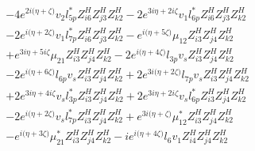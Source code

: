 \begin{align}
 &-4 e^{2 i \Big(\eta +\zeta \Big)} v_2 l_{5p}^* Z_{{i 6}}^{H} Z_{{j 3}}^{H} Z_{{k 2}}^{H} -2 e^{3 i \eta +2 i \zeta } v_1 l_{6p}^* Z_{{i 6}}^{H} Z_{{j 3}}^{H} Z_{{k 2}}^{H} \nonumber \\ 
 &-2 e^{i \Big(\eta +2 \zeta \Big)} v_1 l_{7p}^* Z_{{i 6}}^{H} Z_{{j 3}}^{H} Z_{{k 2}}^{H} - e^{i \Big(\eta +5 \zeta \Big)} \mu_{12} Z_{{i 3}}^{H} Z_{{j 4}}^{H} Z_{{k 2}}^{H} \nonumber \\ 
 &+e^{3 i \eta +5 i \zeta } \mu_{21} Z_{{i 3}}^{H} Z_{{j 4}}^{H} Z_{{k 2}}^{H} -2 e^{i \Big(\eta +4 \zeta \Big)} l_{3p} v_s Z_{{i 3}}^{H} Z_{{j 4}}^{H} Z_{{k 2}}^{H} \nonumber \\ 
 &-2 e^{i \Big(\eta +6 \zeta \Big)} l_{6p} v_s Z_{{i 3}}^{H} Z_{{j 4}}^{H} Z_{{k 2}}^{H} +2 e^{3 i \Big(\eta +2 \zeta \Big)} l_{7p} v_s Z_{{i 3}}^{H} Z_{{j 4}}^{H} Z_{{k 2}}^{H} \nonumber \\ 
 &+2 e^{3 i \eta +4 i \zeta } v_s l_{3p}^* Z_{{i 3}}^{H} Z_{{j 4}}^{H} Z_{{k 2}}^{H} +2 e^{3 i \eta +2 i \zeta } v_s l_{6p}^* Z_{{i 3}}^{H} Z_{{j 4}}^{H} Z_{{k 2}}^{H} \nonumber \\ 
 &-2 e^{i \Big(\eta +2 \zeta \Big)} v_s l_{7p}^* Z_{{i 3}}^{H} Z_{{j 4}}^{H} Z_{{k 2}}^{H} +e^{3 i \Big(\eta +\zeta \Big)} \mu_{12}^* Z_{{i 3}}^{H} Z_{{j 4}}^{H} Z_{{k 2}}^{H} \nonumber \\ 
 &- e^{i \Big(\eta +3 \zeta \Big)} \mu_{21}^* Z_{{i 3}}^{H} Z_{{j 4}}^{H} Z_{{k 2}}^{H} -i e^{i \Big(\eta +4 \zeta \Big)} l_6 v_1 Z_{{i 4}}^{H} Z_{{j 4}}^{H} Z_{{k 2}}^{H} \nonumber 
\end{align} 
